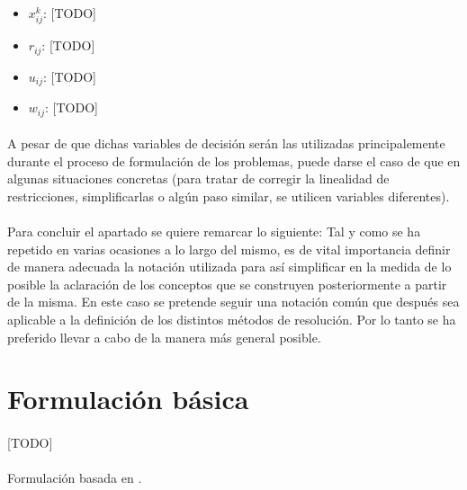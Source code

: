 \documentclass{subfiles}
\begin{document}
        \begin{itemize}
          \item $x_{ij}^{k}$: [TODO]
          \item $r_{ij}$: [TODO]
          \item $u_{ij}$: [TODO]
          \item $w_{ij}$: [TODO]
        \end{itemize}

        \paragraph{}
        A pesar de que dichas variables de decisión serán las utilizadas principalemente durante el proceso de formulación de los problemas, puede darse el caso de que en algunas situaciones concretas (para tratar de corregir la linealidad de restricciones, simplificarlas o algún paso similar, se utilicen variables diferentes).

      \paragraph{}
      Para concluir el apartado se quiere remarcar lo siguiente: Tal y como se ha repetido en varias ocasiones a lo largo del mismo, es de vital importancia definir de manera adecuada la notación utilizada para así simplificar en la medida de lo posible la aclaración de los conceptos que se construyen posteriormente a partir de la misma. En este caso se pretende seguir una notación común que después sea aplicable a la definición de los distintos métodos de resolución. Por lo tanto se ha preferido llevar a cabo de la manera más general posible.

    \section{Formulación básica}
    \label{sec:formulation_basic_formulation}

      \paragraph{}
      [TODO]

      \paragraph{}
       Formulación basada en \cite{cordeau2006branch}.
\end{document}
